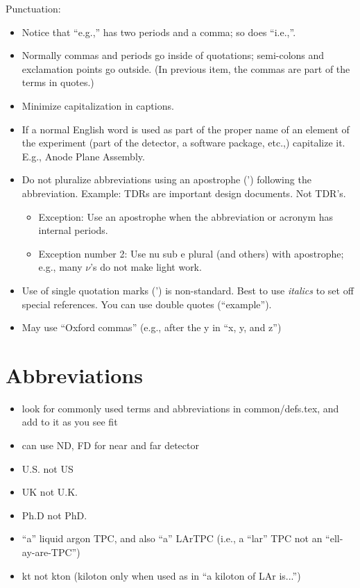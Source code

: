 Punctuation:
\begin{itemize}
\item Notice that ``e.g.,'' has two periods and a comma; so does ``i.e.,''.
\item Normally commas and periods go inside of quotations;  semi-colons and exclamation points go outside.  (In previous item, the commas are part of the terms in quotes.)
\item Minimize capitalization in captions.
\item If a normal English word is used as part of the proper name of an element of the experiment (part of the detector, a software package, etc.,) capitalize it. E.g., Anode Plane Assembly. 
\item Do not pluralize abbreviations using an apostrophe (') following the abbreviation. Example: TDRs are important design documents. Not TDR's. 
\begin{itemize}
\item Exception: Use an apostrophe when the abbreviation or acronym has internal periods. 
\item Exception number \num{2}: Use nu sub e plural (and others) with apostrophe; e.g., many $\nu$'s do not make light work.
\end{itemize}
\item Use of single quotation marks (') is non-standard. Best to use \emph{italics} to set off special references. You can use double quotes (``example''). 
\item May use ``Oxford commas'' (e.g., after the y in ``x, y, and z'') 
\end{itemize}


\section{Abbreviations}
\label{sec:english-abbrevs}

\begin{itemize}
\item look for commonly used terms and abbreviations in common/defs.tex, and add to it as you see fit 
\item can use ND, FD for near and far detector
\item U.S. not US
\item UK not U.K. 
\item Ph.D not PhD.
\item ``a'' liquid argon TPC, and also ``a'' LArTPC (i.e., a ``lar'' TPC not an ``ell-ay-are-TPC'') 
\item \si{kt} not \si{kton} (kiloton only when used as in ``a kiloton of LAr is...'') 

\end{itemize}

